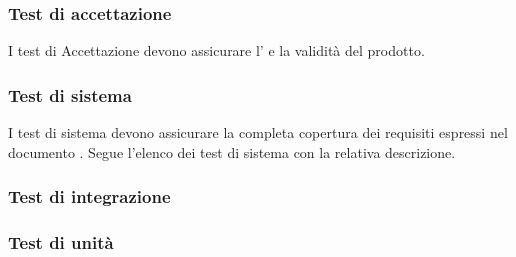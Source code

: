 \subsubsection{Test di accettazione}
I test di Accettazione devono assicurare l' e la validità del prodotto.


\newpage


\newpage
\subsubsection{Test di sistema}
I test di sistema devono assicurare la completa copertura dei requisiti espressi nel documento \AdR{}.
Segue l'elenco dei test di sistema con la relativa descrizione.


\newpage

\newpage

\subsubsection{Test di integrazione}


\newpage

\newpage

\subsubsection{Test di unità}


\newpage

\newpage